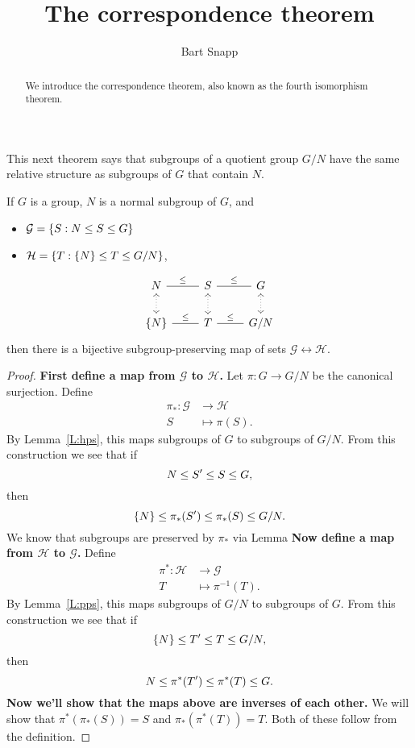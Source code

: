 \documentclass{ximera}
\author{Bart Snapp}
\title{The correspondence theorem}
\begin{document}
\begin{abstract}
  We introduce the correspondence theorem, also known as the fourth
  isomorphism theorem.
\end{abstract}
\maketitle

This next theorem says that subgroups of a quotient group $G/N$ have
the same relative structure as subgroups of $G$ that contain $N$.

\begin{theorem}
  If $G$ is a group, $N$ is a normal subgroup of $G$, and
  \begin{itemize}
  \item $\mathcal{G} = \{S:N\leq S\leq G\}$
  \item $\mathcal{H} = \{T:\{N\}\leq T\leq G/N\}$,
  \end{itemize}
  \[
  \begin{tikzcd}
    N \ar[r,-,"\subgp"] \ar[d,<->,dotted]& S\ar[r,-,"\subgp"] \ar[d,<->,dotted]& G \ar[d,<->,dotted]\\
    \{N\} \ar[r,-,"\subgp"] & T \ar[r,-,"\subgp"] & G/N
  \end{tikzcd}
  \]
  then there is a bijective subgroup-preserving map of sets
  $\mathcal{G}\leftrightarrow\mathcal{H}$.
  \begin{proof}
    \textbf{First define a map from $\pmb{\mathcal{G}}$ to
      $\pmb{\mathcal{H}}$.} Let $\pi:G\to G/N$ be the canonical
    surjection.  Define
    \begin{align*}
    \pi_*:\mathcal{G} &\to \mathcal{H}\\
    S &\mapsto \pi(S).
    \end{align*}
    By Lemma~\ref{L:hps}, this maps subgroups of $G$ to subgroups of
    $G/N$. From this construction we see that if
    \[
    N \leq S'\leq S \leq G,
    \]
    then
    \[
    \{N\}\leq \pi_*(S') \leq \pi_*(S)\leq G/N.
    \]
    We know that subgroups are preserved by $\pi_*$ via Lemma
    \textbf{Now define a map from $\pmb{\mathcal{H}}$ to
      $\pmb{\mathcal{G}}$.}  Define
    \begin{align*}
      \pi^*:\mathcal{H} &\to \mathcal G\\ T &\mapsto
      \pi^{-1}(T).
    \end{align*}
    By Lemma~\ref{L:pps}, this maps subgroups of $G/N$ to subgroups of
    $G$.  From this construction we see that if
    \[
    \{N\} \leq T\hspace{0em}' \leq T \leq G/N,
    \]
    then
    \[
    N \leq \pi^*(T\hspace{0em}')\leq \pi^*(T) \leq G.
    \]
    \textbf{Now we'll show that the maps above are inverses of each
      other.} We will show that $\pi^*(\pi_*(S)) = S$ and
    $\pi_*(\pi^*(T)) = T$. Both of these follow from the
    definition.


\end{proof}
\end{theorem}
\end{document}

